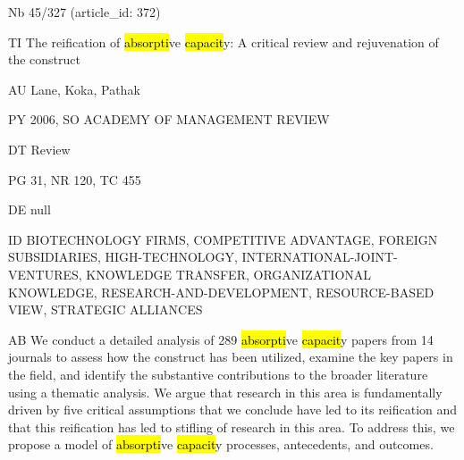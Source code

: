 \documentclass[a4paper]{article}
\begin{document}
\vspace*{-2cm}
Nb \tabto{0cm}45/327 (article\_id: 372)\par
TI \tabto{0cm}The reification of \hl{absorpti}ve \hl{capacit}y: A critical review and rejuvenation of the construct\par
AU \tabto{0cm}Lane, Koka, Pathak\par
PY \tabto{0cm}2006, SO ACADEMY OF MANAGEMENT REVIEW\par
DT \tabto{0cm}Review\par
PG \tabto{0cm}31, NR 120, TC 455\par
DE \tabto{0cm}null\par
ID \tabto{0cm}BIOTECHNOLOGY FIRMS, COMPETITIVE ADVANTAGE, FOREIGN SUBSIDIARIES, HIGH-TECHNOLOGY, INTERNATIONAL-JOINT-VENTURES, KNOWLEDGE TRANSFER, ORGANIZATIONAL KNOWLEDGE, RESEARCH-AND-DEVELOPMENT, RESOURCE-BASED VIEW, STRATEGIC ALLIANCES\par
AB \tabto{0cm}We conduct a detailed analysis of 289 \hl{absorpti}ve \hl{capacit}y papers from 14 journals to assess how the construct has been utilized, examine the key papers in the field, and identify the substantive contributions to the broader literature using a thematic analysis. We argue that research in this area is fundamentally driven by five critical assumptions that we conclude have led to its reification and that this reification has led to stifling of research in this area. To address this, we propose a model of \hl{absorpti}ve \hl{capacit}y processes, antecedents, and outcomes.\par
\clearpage
\end{document}

